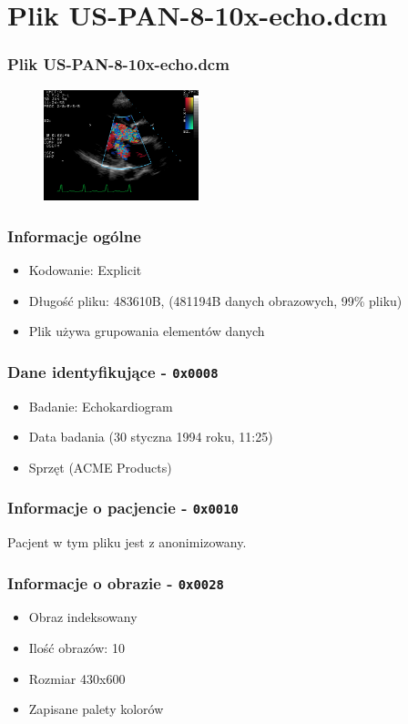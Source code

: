 \section{Plik US-PAN-8-10x-echo.dcm}
\begin{frame}
  \frametitle{Plik US-PAN-8-10x-echo.dcm}

  \begin{figure}
    \includegraphics[width=0.4\textwidth]{echo}
  \end{figure}
\end{frame}

\begin{frame}
  \frametitle{Informacje ogólne}
  \begin{itemize}
    \item Kodowanie: Explicit
    \item Długość pliku: 483610B, (481194B danych obrazowych, 99\% pliku)
    \item Plik używa grupowania elementów danych
  \end{itemize}
\end{frame}

\begin{frame}
  \frametitle{Dane identyfikujące - \texttt{0x0008}}

  \begin{itemize}
    \item Badanie: Echokardiogram
    \item Data badania (30 styczna 1994 roku, 11:25)
    \item Sprzęt (ACME Products)
  \end{itemize}
\end{frame}


\begin{frame}
  \frametitle{Informacje o pacjencie - \texttt{0x0010}}
  \begin{center}
    Pacjent w tym pliku jest z anonimizowany.
  \end{center}
\end{frame}


\begin{frame}
  \frametitle{Informacje o obrazie - \texttt{0x0028}}
\begin{itemize}
  \item Obraz indeksowany
  \item Ilość obrazów: 10
  \item Rozmiar 430x600
  \item Zapisane palety kolorów
\end{itemize}
\end{frame}
